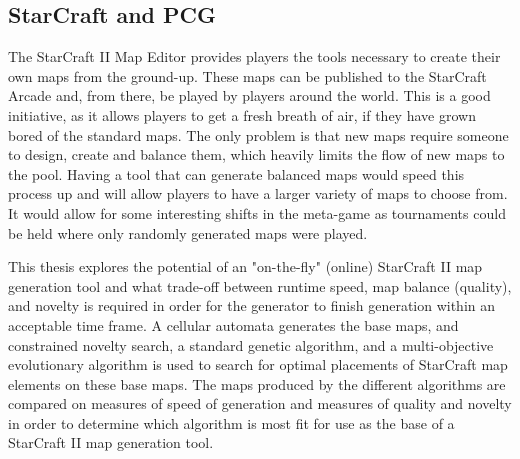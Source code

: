 
\subsection{StarCraft and PCG}
\label{introduction_starcraft_pcg}

The StarCraft II Map Editor provides players the tools necessary to create their own maps from the ground-up. These maps can be published to the StarCraft Arcade\cite{starcraftarcade} and, from there, be played by players around the world. This is a good initiative, as it allows players to get a fresh breath of air, if they have grown bored of the standard maps. The only problem is that new maps require someone to design, create and balance them, which heavily limits the flow of new maps to the pool. Having a tool that can generate balanced maps would speed this process up and will allow players to have a larger variety of maps to choose from. It would allow for some interesting shifts in the meta-game as tournaments could be held where only randomly generated maps were played. 

This thesis explores the potential of an "on-the-fly" (online) StarCraft II map generation tool and what trade-off between runtime speed, map balance (quality), and novelty is required in order for the generator to finish generation within an acceptable time frame. A cellular automata generates the base maps, and constrained novelty search, a standard genetic algorithm, and a multi-objective evolutionary algorithm is used to search for optimal placements of StarCraft map elements on these base maps. The maps produced by the different algorithms are compared on measures of speed of generation and measures of quality and novelty in order to determine which algorithm is most fit for use as the base of a StarCraft II map generation tool. 